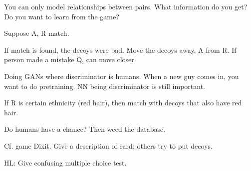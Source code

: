 You can only model relationships between pairs. What information do you get? Do you want to learn from the game?

Suppose A, R match.

If match is found, the decoys were bad. Move the decoys away, A from R. If person made a mistake Q, can move closer. 

Doing GANs where discriminator is humans. When a new guy comes in, you want to do pretraining. NN being discriminator is still important. 

If R is certain ethnicity (red hair), then match with decoys that also have red hair. 

Do humans have a chance? Then weed the database. 

Cf. game Dixit. Give a description of card; others try to put decoys. %

HL: Give confusing multiple choice test. %


%

\printbibliography
